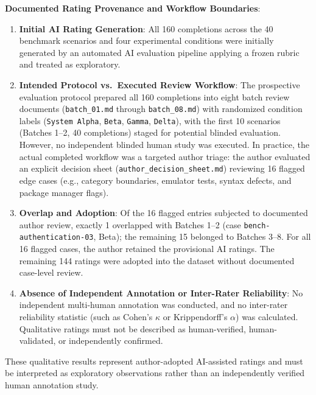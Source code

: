 \documentclass[11pt,a4paper]{article}
\begin{document}
\textbf{Documented Rating Provenance and Workflow Boundaries}:
\begin{enumerate}
    \item \textbf{Initial AI Rating Generation}: All 160 completions across the 40 benchmark scenarios and four experimental conditions were initially generated by an automated AI evaluation pipeline applying a frozen rubric and treated as exploratory.
    \item \textbf{Intended Protocol vs.\ Executed Review Workflow}: The prospective evaluation protocol prepared all 160 completions into eight batch review documents (\texttt{batch\_01.md} through \texttt{batch\_08.md}) with randomized condition labels (\texttt{System Alpha}, \texttt{Beta}, \texttt{Gamma}, \texttt{Delta}), with the first 10 scenarios (Batches 1--2, 40 completions) staged for potential blinded evaluation. However, no independent blinded human study was executed. In practice, the actual completed workflow was a targeted author triage: the author evaluated an explicit decision sheet (\texttt{author\_decision\_sheet.md}) reviewing 16 flagged edge cases (e.g., category boundaries, emulator tests, syntax defects, and package manager flags).
    \item \textbf{Overlap and Adoption}: Of the 16 flagged entries subjected to documented author review, exactly 1 overlapped with Batches 1--2 (case \texttt{bench-authentication-03}, Beta); the remaining 15 belonged to Batches 3--8. For all 16 flagged cases, the author retained the provisional AI ratings. The remaining 144 ratings were adopted into the dataset without documented case-level review.
    \item \textbf{Absence of Independent Annotation or Inter-Rater Reliability}: No independent multi-human annotation was conducted, and no inter-rater reliability statistic (such as Cohen's $\kappa$ or Krippendorff's $\alpha$) was calculated. Qualitative ratings must not be described as human-verified, human-validated, or independently confirmed.
\end{enumerate}
These qualitative results represent author-adopted AI-assisted ratings and must be interpreted as exploratory observations rather than an independently verified human annotation study.
\end{document}
